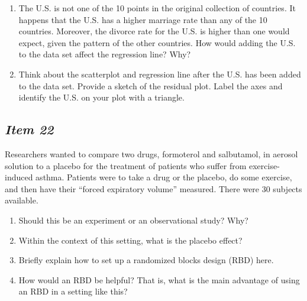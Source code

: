 \begin{enumerate}[leftmargin=1cm, itemsep=.2em]
\item The U.S. is not one of the 10 points in the original collection of countries.  It happens that the U.S. has a higher marriage rate than any of the 10 countries.  Moreover, the divorce rate for the U.S. is higher than one would expect, given the pattern of the other countries.  How would adding the U.S. to the data set affect the regression line?  Why?
\item Think about the scatterplot and regression line after the U.S. has been added to the data set.  Provide a sketch of the residual plot.  Label the axes and identify the U.S. on your plot with a triangle.
\end{enumerate}


\subsection{\textbf{\textit{Item 22}}}
Researchers wanted to compare two drugs, formoterol and salbutamol, in aerosol solution to a placebo for the treatment of patients who suffer from exercise-induced asthma.  Patients were to take a drug or the placebo, do some exercise, and then have their ``forced expiratory volume'' measured.  There were 30 subjects available. 
\begin{enumerate}[leftmargin=1cm, itemsep=.2em]
\item Should this be an experiment or an observational study?  Why?
\item Within the context of this setting, what is the placebo effect?
\item Briefly explain how to set up a randomized blocks design (RBD) here.
\item How would an RBD be helpful?  That is, what is the main advantage of using an RBD in a setting like this?
\end{enumerate}

